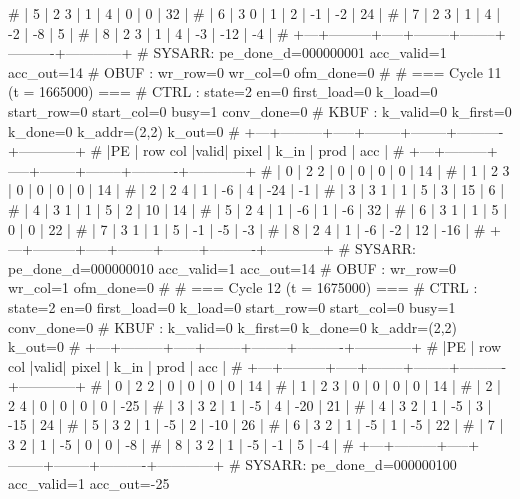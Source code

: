 # | 5 |   2   3 |  1  |      4 |      0 |        0 |         32 |
# | 6 |   3   0 |  1  |      2 |     -1 |       -2 |         24 |
# | 7 |   2   3 |  1  |      4 |     -2 |       -8 |          5 |
# | 8 |   2   3 |  1  |      4 |     -3 |      -12 |         -4 |
# +---+---------+-----+--------+--------+----------+------------+
# SYSARR: pe_done_d=000000001 acc_valid=1 acc_out=14
# OBUF : wr_row=0 wr_col=0 ofm_done=0
# 
# === Cycle 11  (t = 1665000) ===
# CTRL : state=2 en=0 first_load=0 k_load=0 start_row=0 start_col=0 busy=1 conv_done=0
# KBUF : k_valid=0 k_first=0 k_done=0 k_addr=(2,2) k_out=0
# +---+---------+-----+--------+--------+----------+------------+
# |PE | row col |valid| pixel  |  k_in  |   prod   |    acc     |
# +---+---------+-----+--------+--------+----------+------------+
# | 0 |   2   2 |  0  |      0 |      0 |        0 |         14 |
# | 1 |   2   3 |  0  |      0 |      0 |        0 |         14 |
# | 2 |   2   4 |  1  |     -6 |      4 |      -24 |         -1 |
# | 3 |   3   1 |  1  |      5 |      3 |       15 |          6 |
# | 4 |   3   1 |  1  |      5 |      2 |       10 |         14 |
# | 5 |   2   4 |  1  |     -6 |      1 |       -6 |         32 |
# | 6 |   3   1 |  1  |      5 |      0 |        0 |         22 |
# | 7 |   3   1 |  1  |      5 |     -1 |       -5 |         -3 |
# | 8 |   2   4 |  1  |     -6 |     -2 |       12 |        -16 |
# +---+---------+-----+--------+--------+----------+------------+
# SYSARR: pe_done_d=000000010 acc_valid=1 acc_out=14
# OBUF : wr_row=0 wr_col=1 ofm_done=0
# 
# === Cycle 12  (t = 1675000) ===
# CTRL : state=2 en=0 first_load=0 k_load=0 start_row=0 start_col=0 busy=1 conv_done=0
# KBUF : k_valid=0 k_first=0 k_done=0 k_addr=(2,2) k_out=0
# +---+---------+-----+--------+--------+----------+------------+
# |PE | row col |valid| pixel  |  k_in  |   prod   |    acc     |
# +---+---------+-----+--------+--------+----------+------------+
# | 0 |   2   2 |  0  |      0 |      0 |        0 |         14 |
# | 1 |   2   3 |  0  |      0 |      0 |        0 |         14 |
# | 2 |   2   4 |  0  |      0 |      0 |        0 |        -25 |
# | 3 |   3   2 |  1  |     -5 |      4 |      -20 |         21 |
# | 4 |   3   2 |  1  |     -5 |      3 |      -15 |         24 |
# | 5 |   3   2 |  1  |     -5 |      2 |      -10 |         26 |
# | 6 |   3   2 |  1  |     -5 |      1 |       -5 |         22 |
# | 7 |   3   2 |  1  |     -5 |      0 |        0 |         -8 |
# | 8 |   3   2 |  1  |     -5 |     -1 |        5 |         -4 |
# +---+---------+-----+--------+--------+----------+------------+
# SYSARR: pe_done_d=000000100 acc_valid=1 acc_out=-25
